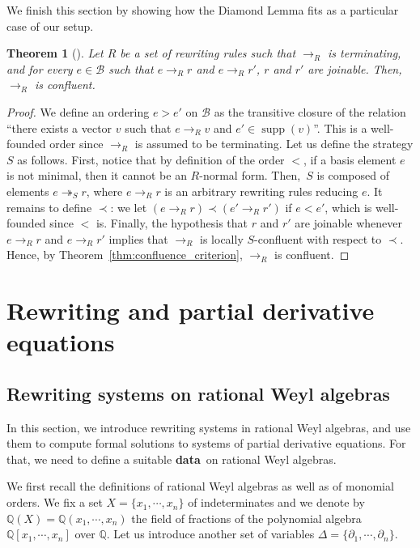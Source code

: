 \documentclass[10pt]{easychair}
\newtheorem{theorem}{Theorem}[section]
\theoremstyle{definition}
\newcommand\data{{\color{red}\bf data}}
\DeclareMathOperator{\supp}{supp}
\newcommand\diff[1]{\partial_{#1}}
\newcommand\basis{\mathscr{B}}
\newcommand\Q{\mathbb{Q}}
\newcommand\QX{\mathbb{Q}[x_1,\cdots,x_n]}
\newcommand\QXX{\mathbb{Q}(x_1,\cdots,x_n)}
\newcommand\rewR{\to_R}
\newcommand\rewS{\twoheadrightarrow_S}
\begin{document}
We finish this section by showing how the Diamond Lemma fits as a
particular case of our setup.
\medskip

\begin{theorem}[\cite{MR506890}]\label{thm:diamond_lemma}
  Let $R$ be a set of rewriting rules such that $\rewR$ is terminating,
  and for every $e\in\basis$ such that $e\rewR r$ and $e\rewR r'$, $r$
  and $r'$ are joinable. Then,~$\rewR$ is confluent.
\end{theorem}

\begin{proof}
  We define an ordering $e>e'$ on $\basis$ as the transitive closure of
  the relation ``there exists a vector $v$ such that $e\rewR v$ and
  $e'\in\supp(v)$''. This is a well-founded order since $\rewR$ is
  assumed to be terminating. Let us define the strategy $S$ as follows.
  First, notice that by definition of the order $<$, if a basis element
  $e$ is not minimal, then it cannot be an $R$-normal form. Then,~$S$ is
  composed of elements $e\rewS r$, where $e\rewR r$ is an arbitrary
  rewriting rules reducing $e$. It remains to define $\prec$: we let
  $(e\rewR r)\prec(e'\rewR r')$ if $e<e'$, which is well-founded since
  $<$ is. Finally, the hypothesis that $r$ and $r'$ are joinable whenever
  $e\rewR r$ and $e\rewR r'$ implies that $\rewR$ is locally
  $S$-confluent with respect to $\prec$. Hence, by
  Theorem~\ref{thm:confluence_criterion}, $\rewR$ is confluent.   
\end{proof}

\section{Rewriting and partial derivative equations}
\label{sec:rewriting_systems_and_partial_derivative_equations}

\subsection{Rewriting systems on rational Weyl algebras}
\label{sec:rewriting_systems_on_Weyl_algebras}

In this section, we introduce rewriting systems in rational Weyl
algebras, and use them to compute formal solutions to systems of partial
derivative equations. For that, we need to define a suitable \data\ on
rational Weyl algebras. 
\medskip

We first recall the definitions of rational Weyl algebras as well as of
monomial orders. We fix a set $X=\{x_1,\cdots,x_n\}$ of indeterminates
and we denote by $\Q(X)=\QXX$ the field of fractions of the polynomial
algebra $\QX$ over $\Q$. Let us introduce another set of variables
$\Delta=\{\diff{1},\cdots,\diff{n}\}$.
\smallskip
\end{document}
